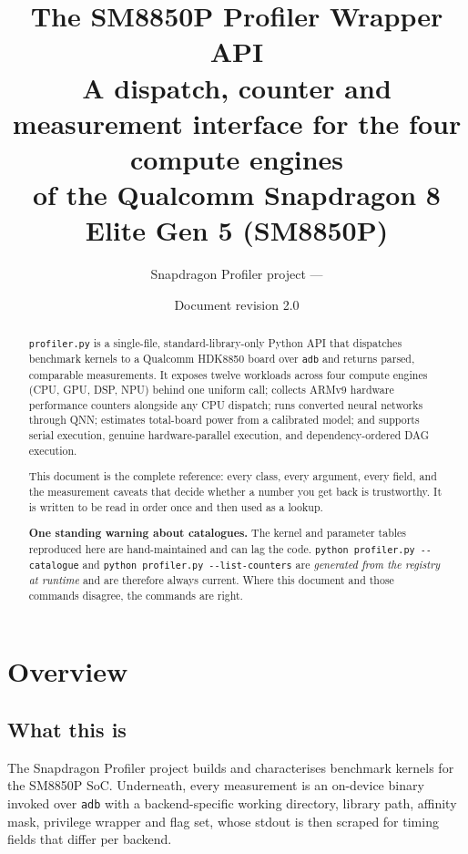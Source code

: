 \documentclass[11pt,a4paper]{article}
\title{\vspace{-1.5cm}\textbf{The SM8850P Profiler Wrapper API}\\[0.3cm]
       \large A dispatch, counter and measurement interface for the four compute
       engines\\ of the Qualcomm Snapdragon 8 Elite Gen 5 (SM8850P)}
\author{Snapdragon Profiler project --- \code{profiler.py}}
\date{Document revision 2.0}
\newcommand{\code}[1]{\texttt{\let\_\breakableunderscore #1}}
\newcommand{\breakableunderscore}{\textunderscore\allowbreak}
\begin{document}
\maketitle
\thispagestyle{fancy}

\begin{abstract}
\noindent
\code{profiler.py} is a single-file, standard-library-only Python API that
dispatches benchmark kernels to a Qualcomm HDK8850 board over \code{adb} and
returns parsed, comparable measurements. It exposes twelve workloads across
four compute engines (CPU, GPU, DSP, NPU) behind one uniform call; collects
ARMv9 hardware performance counters alongside any CPU dispatch; runs converted
neural networks through QNN; estimates total-board power from a calibrated
model; and supports serial execution, genuine hardware-parallel execution, and
dependency-ordered DAG execution.

This document is the complete reference: every class, every argument, every
field, and the measurement caveats that decide whether a number you get back is
trustworthy. It is written to be read in order once and then used as a lookup.

\medskip
\noindent\textbf{One standing warning about catalogues.} The kernel and
parameter tables reproduced here are hand-maintained and can lag the code.
\code{python profiler.py -{}-catalogue} and \code{python profiler.py
-{}-list-counters} are \emph{generated from the registry at runtime} and are
therefore always current. Where this document and those commands disagree,
the commands are right.
\end{abstract}

\tableofcontents
\newpage

\section{Overview}

\subsection{What this is}

The Snapdragon Profiler project builds and characterises benchmark kernels for
the SM8850P SoC. Underneath, every measurement is an on-device binary invoked
over \code{adb} with a backend-specific working directory, library path,
affinity mask, privilege wrapper and flag set, whose stdout is then scraped for
timing fields that differ per backend.
\end{document}
